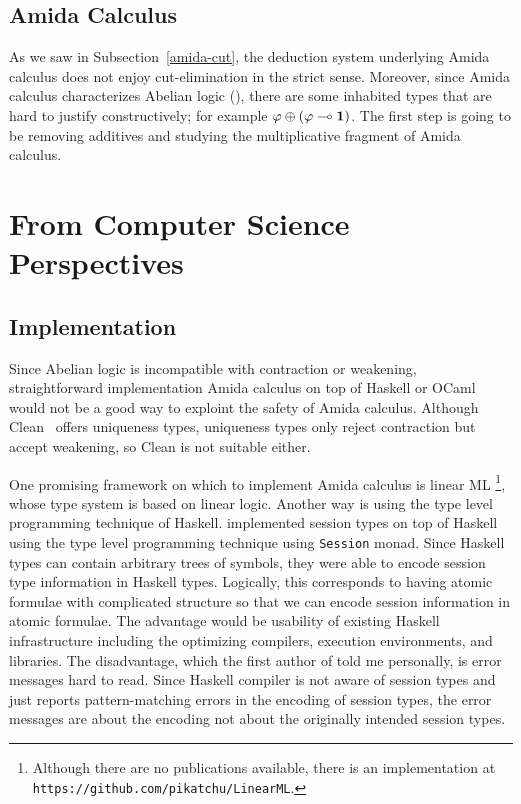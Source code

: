 \subsection{Amida Calculus}

As we saw in Subsection~\ref{amida-cut},
the deduction system underlying Amida calculus does not enjoy
cut-elimination in the strict sense.
Moreover, since Amida calculus characterizes Abelian logic
(),
there are some inhabited types that are hard to justify constructively;
for example $\varphi\oplus(\varphi\multimap\mathbf{1})$.
The first step is going to be removing additives and studying the
multiplicative fragment of Amida calculus.

\section{From Computer Science Perspectives}

\subsection{Implementation}

Since Abelian logic is incompatible with contraction or weakening,
straightforward implementation Amida calculus on top of Haskell or OCaml
would not be a
good way to exploint the safety of Amida calculus.
Although Clean~\citep{parle1991} offers uniqueness types,
uniqueness types only reject contraction but accept weakening, so Clean
is not suitable either.

One promising framework on which to implement Amida calculus is linear ML%
\footnote{Although there are no
publications available, there is an implementation at
\texttt{https://github.com/pikatchu/LinearML}\enspace.},
whose type system is based on linear logic.
Another way is using the type level programming technique of Haskell.
\citet{DBLP:journals/corr/abs-1110-4163} implemented session types on top
of Haskell using the type level programming technique using
\texttt{Session} monad.  Since Haskell types can contain arbitrary trees
of symbols, they were able to encode session type information in Haskell
types.
Logically, this corresponds to having atomic formulae with complicated
structure so that we can encode session information in atomic formulae.
The advantage would be usability of existing Haskell infrastructure
including the optimizing compilers, execution environments, and
libraries.
The disadvantage, which the first author of
\citep{DBLP:journals/corr/abs-1110-4163} told me personally,
is error messages hard to read.
Since Haskell compiler is not aware of session types and just reports
pattern-matching errors in the encoding of session types, the error
messages are about the encoding not about the originally intended
session types.


